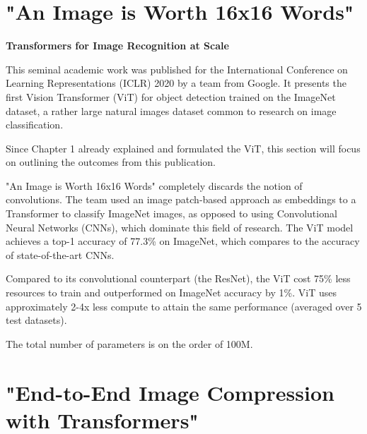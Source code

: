 \section{"An Image is Worth 16x16 Words"}

\textbf{Transformers for Image Recognition at Scale}


This seminal academic work was published for the International Conference on 
Learning Representations (ICLR) 2020 by a team from Google.
It presents the first Vision Transformer (ViT) for object detection
trained on the ImageNet dataset, a rather large natural images dataset common to research on 
image classification.


Since Chapter 1 already explained and formulated the ViT, this section will focus
on outlining the outcomes from this publication.

"An Image is Worth 16x16 Words" completely discards the notion of convolutions. 
The team used an image patch-based approach as embeddings to a Transformer to classify ImageNet images, 
as opposed to using Convolutional Neural Networks (CNNs), which dominate this field of research.
The ViT model achieves a top-1 accuracy of 77.3\% on ImageNet, which 
compares to the accuracy of state-of-the-art CNNs.

Compared to its convolutional counterpart (the ResNet), the ViT cost 75\% 
less resources to train and outperformed on ImageNet accuracy by 1\%. 
ViT uses approximately 2-4x less compute to attain the same performance 
(averaged over 5 test datasets). 

The total number of parameters is on the order of 100M.







\newpage
\section{"End-to-End Image Compression with Transformers"}

